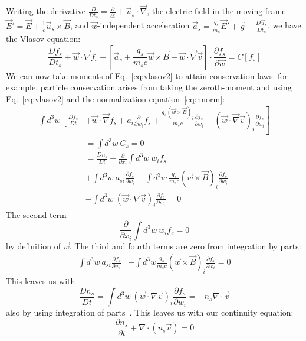 Writing the derivative $\frac{D}{Dt_s}=\frac{\partial}{\partial t}+\vec u_s\cdot\vec\nabla$, the electric field in the moving frame $\vec E'=\vec E+\frac1c\vec u_s\times\vec B$, and $\vec w$-independent acceleration $\vec a_s=\frac{q_s}{m_s}\vec E'+\vec g-\frac{D\vec u_s}{Dt_s}$, we have the Vlasov equation:
\begin{equation}
  \frac{Df_s}{Dt_s}+\vec w\cdot\vec\nabla f_s+\left[\vec a_s+\frac{q_s}{m_sc}\vec w\times\vec B-\vec w\cdot\vec\nabla\vec v\right]\cdot\frac{\partial f_s}{\partial\vec w}=C[f_s]\label{eq:vlasov2}
\end{equation}
We can now take moments of Eq.~\ref{eq:vlasov2} to attain conservation laws: for example, particle conservation arises from taking the zeroth-moment and using Eq.~\ref{eq:vlasov2} and the normalization equation~\ref{eq:nnorm}:
\begin{align*}
  \int d^3w~\left[\frac{Df_s}{Dt}\right.&\left.+\vec w\cdot \vec\nabla f_s+a_i\frac{\partial}{\partial w_i} f_s+\frac{q_s(\vec w\times\vec B)_i}{m_sc}\frac{\partial f_s}{\partial w_i}-(\vec w\cdot\vec\nabla\vec v)_i\frac{\partial f_s}{\partial w_i} \right]\\
  &=\int d^3w~C_s=0\\
  &=\frac{Dn_s}{Dt}+\frac{\partial}{\partial x_i}\int d^3w~w_if_s\\
  &+\int d^3w~a_{si}\frac{\partial f_s}{\partial w_i}+\int d^3w~\frac{q_s}{m_sc}(\vec w\times\vec B)_i\frac{\partial f_s}{\partial w_i}\\
  &-\int d^3w~(\vec w\cdot\nabla\vec v)_i\frac{\partial f_s}{\partial w_i}=0
\end{align*}
The second term
\begin{equation*}
  \frac{\partial}{\partial x_i}\int d^3w~w_if_s=0
\end{equation*}
by definition of $\vec w$. The third and fourth terms are zero from integration by parts:
\begin{align*}
  \int d^3w~a_{si}\frac{\partial f_s}{\partial w_i}&+\int d^3w\frac{q_s}{m_sc}(\vec w\times\vec B)_i\frac{\partial f_s}{\partial w_i}=0
\end{align*}
This leaves us with
\begin{equation*}
  \frac{Dn_s}{Dt}=\int d^3w~(\vec w\cdot\nabla \vec v)_i\frac{\partial f_s}{\partial w_i}=-n_s\nabla\cdot\vec v
\end{equation*}
also by using integration of parts~\cite{KunzLecture1}. This leaves us with our continuity equation:
\begin{equation}
  \frac{\partial n_s}{\partial t}+\nabla\cdot(n_s\vec v)=0\label{eq:ncons}
\end{equation}
